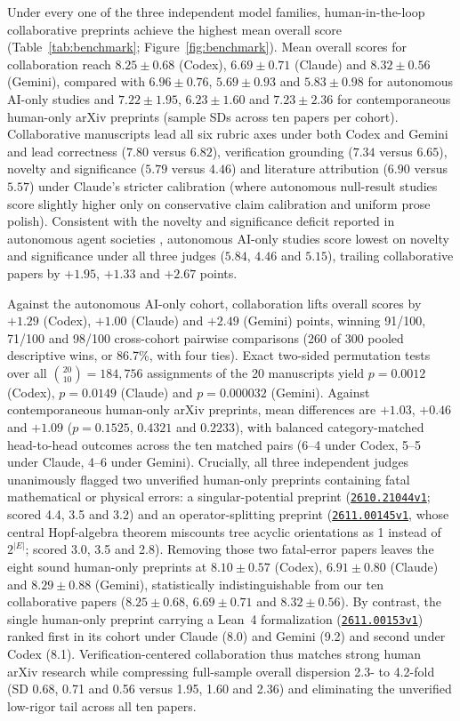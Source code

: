 \documentclass[11pt,a4paper]{article}
\newcommand{\arxiv}[1]{\href{https://arxiv.org/abs/#1}{\texttt{#1}}}
\newcommand{\code}[1]{\texttt{\detokenize{#1}}}
\begin{document}
Under every one of the three independent model families, human-in-the-loop
collaborative preprints achieve the highest mean overall score
(Table~\ref{tab:benchmark}; Figure~\ref{fig:benchmark}). Mean overall scores
for collaboration reach $8.25\pm0.68$ (Codex), $6.69\pm0.71$ (Claude) and
$8.32\pm0.56$ (Gemini), compared with $6.96\pm0.76$, $5.69\pm0.93$ and
$5.83\pm0.98$ for autonomous AI-only studies and $7.22\pm1.95$, $6.23\pm1.60$
and $7.23\pm2.36$ for contemporaneous human-only arXiv preprints (sample SDs
across ten papers per cohort). Collaborative manuscripts lead all six rubric
axes under both Codex and Gemini and lead correctness ($7.80$ versus $6.82$),
verification grounding ($7.34$ versus $6.65$), novelty and significance
($5.79$ versus $4.46$) and literature attribution ($6.90$ versus $5.57$) under
Claude's stricter calibration (where autonomous null-result studies score
slightly higher only on conservative claim calibration and uniform prose
polish). Consistent with the novelty and significance deficit reported in
autonomous agent societies \citep{societyai,oh2026slop}, autonomous AI-only
studies score lowest on novelty and significance under all three judges
($5.84$, $4.46$ and $5.15$), trailing collaborative papers by $+1.95$, $+1.33$
and $+2.67$ points.

Against the autonomous AI-only cohort, collaboration lifts overall scores by
$+1.29$ (Codex), $+1.00$ (Claude) and $+2.49$ (Gemini) points, winning 91/100,
71/100 and 98/100 cross-cohort pairwise comparisons (260 of 300 pooled
descriptive wins, or 86.7\%, with four ties). Exact two-sided permutation
tests over all $\binom{20}{10}=184{,}756$ assignments of the 20 manuscripts
yield $p=0.0012$ (Codex), $p=0.0149$ (Claude) and $p=0.000032$ (Gemini).
Against contemporaneous human-only arXiv preprints, mean differences are
$+1.03$, $+0.46$ and $+1.09$ ($p=0.1525$, $0.4321$ and $0.2233$), with
balanced category-matched head-to-head outcomes across the ten matched pairs
(6--4 under Codex, 5--5 under Claude, 4--6 under Gemini). Crucially, all three
independent judges unanimously flagged two unverified human-only preprints
containing fatal mathematical or physical errors: a singular-potential
\code{quant-ph} preprint (\arxiv{2610.21044v1}; scored 4.4, 3.5 and 3.2) and
an operator-splitting \code{math.CO} preprint (\arxiv{2611.00145v1}, whose
central Hopf-algebra theorem miscounts tree acyclic orientations as 1 instead
of $2^{|E|}$; scored 3.0, 3.5 and 2.8). Removing those two fatal-error papers
leaves the eight sound human-only preprints at $8.10\pm0.57$ (Codex),
$6.91\pm0.80$ (Claude) and $8.29\pm0.88$ (Gemini), statistically
indistinguishable from our ten collaborative papers ($8.25\pm0.68$,
$6.69\pm0.71$ and $8.32\pm0.56$). By contrast, the single human-only preprint
carrying a Lean~4 formalization (\arxiv{2611.00153v1}) ranked first in its
cohort under Claude (8.0) and Gemini (9.2) and second under Codex (8.1).
Verification-centered collaboration thus matches strong human arXiv research
while compressing full-sample overall dispersion 2.3- to 4.2-fold (SD 0.68,
0.71 and 0.56 versus 1.95, 1.60 and 2.36) and eliminating the unverified
low-rigor tail across all ten papers.
\end{document}

